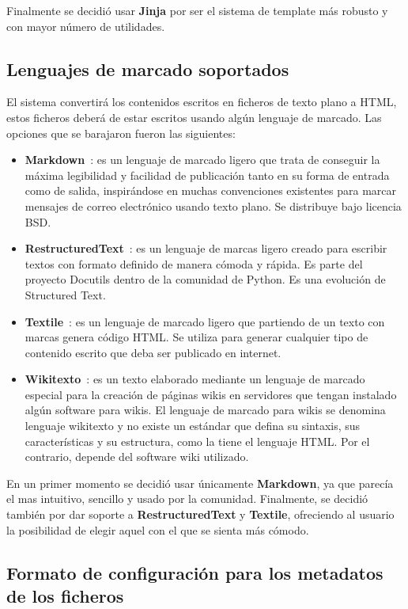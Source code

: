 Finalmente se decidió usar \textbf{Jinja} por ser el sistema de template más robusto y con mayor número de utilidades.

\subsection{Lenguajes de marcado soportados}

El sistema convertirá los contenidos escritos en ficheros de texto plano a HTML, estos ficheros deberá de estar escritos
usando algún lenguaje de marcado. Las opciones que se barajaron fueron las siguientes:

\begin{itemize}
\item \textbf{Markdown}~\cite{markdown}: es un lenguaje de marcado ligero que trata de conseguir la máxima legibilidad y facilidad
de publicación tanto en su forma de entrada como de salida, inspirándose en muchas convenciones existentes para marcar mensajes
de correo electrónico usando texto plano. Se distribuye bajo licencia BSD.
\item \textbf{RestructuredText}~\cite{restructuredtext}: es un lenguaje de marcas ligero creado para escribir textos con formato definido de manera cómoda
y rápida. Es parte del proyecto Docutils dentro de la comunidad de Python. Es una evolución de Structured Text.
\item \textbf{Textile}~\cite{textile}: es un lenguaje de marcado ligero que partiendo de un texto con marcas genera código HTML.
Se utiliza para generar cualquier tipo de contenido escrito que deba ser publicado en internet.
\item \textbf{Wikitexto}~\cite{wikitexto}: es un texto elaborado mediante un lenguaje de marcado especial para la creación de páginas wikis
en servidores que tengan instalado algún software para wikis. El lenguaje de marcado para wikis se denomina lenguaje wikitexto
y no existe un estándar que defina su sintaxis, sus características y su estructura, como la tiene el lenguaje HTML. Por el
contrario, depende del software wiki utilizado.
\end{itemize}

En un primer momento se decidió usar únicamente \textbf{Markdown}, ya que parecía el mas intuitivo, sencillo y usado por la comunidad. Finalmente,
se decidió también por dar soporte a \textbf{RestructuredText} y \textbf{Textile}, ofreciendo al usuario la posibilidad de elegir aquel
con el que se sienta más cómodo.

\subsection{Formato de configuración para los metadatos de los ficheros}

